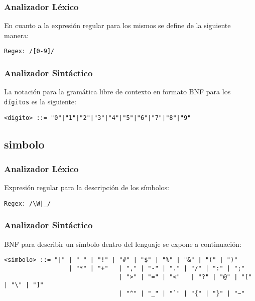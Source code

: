 \subsubsection{Analizador Léxico}

En cuanto a la expresión regular para los mismos se define de la siguiente
manera:

\begin{lstlisting}[basicstyle=\footnotesize\ttfamily]
	Regex: /[0-9]/
\end{lstlisting}

\subsubsection{Analizador Sintáctico}

La notación para la gramática libre de contexto en formato BNF para los
\texttt{dígitos} es la siguiente:

\begin{lstlisting}[basicstyle=\footnotesize\ttfamily, caption={BNF - digito}]
  <digito> ::= "0"|"1"|"2"|"3"|"4"|"5"|"6"|"7"|"8"|"9"
\end{lstlisting}

\subsection{simbolo}
\label{sub:simbolo}

\subsubsection{Analizador Léxico}

Expresión regular para la descripción de los símbolos:

\begin{lstlisting}[basicstyle=\footnotesize\ttfamily, caption={Regex - simbolo}]
  Regex: /\W|_/
\end{lstlisting}

\subsubsection{Analizador Sintáctico}

BNF para describir un símbolo dentro del lenguaje se expone a continuación:

\begin{lstlisting}[basicstyle=\footnotesize\ttfamily, caption={BNF - simbolo}]
	<simbolo> ::= "|" | " " | "!" | "#" | "$" | "%" | "&" | "(" | ")"
	              | "*" | "+"	| "," | "-" | "." | "/" | ":" | ";"
								| ">" | "=" | "<"	| "?" | "@" | "[" | "\"	| "]"
								| "^" | "_" | "`" | "{" | "}" | "~"
\end{lstlisting}


